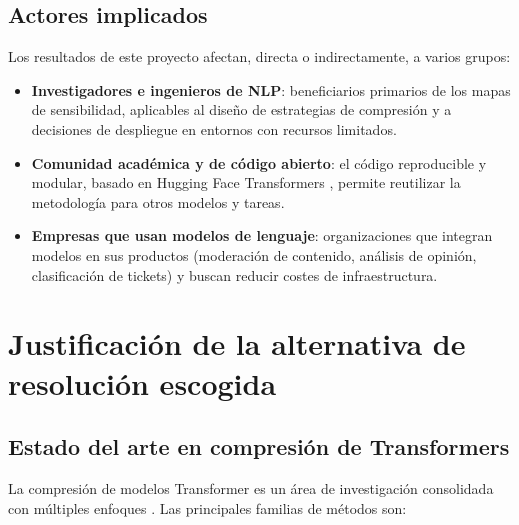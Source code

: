 \documentclass[11pt, a4paper]{article}
\begin{document}
\subsection{Actores implicados}
\label{sec:actores}

Los resultados de este proyecto afectan, directa o indirectamente, a varios grupos:

\begin{itemize}[nosep]
    \item \textbf{Investigadores e ingenieros de NLP}: beneficiarios primarios de los mapas de sensibilidad, aplicables al diseño de estrategias de compresión y a decisiones de despliegue en entornos con recursos limitados.
    \item \textbf{Comunidad académica y de código abierto}: el código reproducible y modular, basado en Hugging Face Transformers \cite{wolf2020transformers}, permite reutilizar la metodología para otros modelos y tareas.
    \item \textbf{Empresas que usan modelos de lenguaje}: organizaciones que integran modelos en sus productos (moderación de contenido, análisis de opinión, clasificación de tickets) y buscan reducir costes de infraestructura.
\end{itemize}

\section{Justificación de la alternativa de resolución escogida}
\label{sec:justificacion}

\subsection{Estado del arte en compresión de Transformers}

La compresión de modelos Transformer es un área de investigación consolidada con múltiples enfoques \cite{ganesh2021compressing}. Las principales familias de métodos son:
\end{document}
